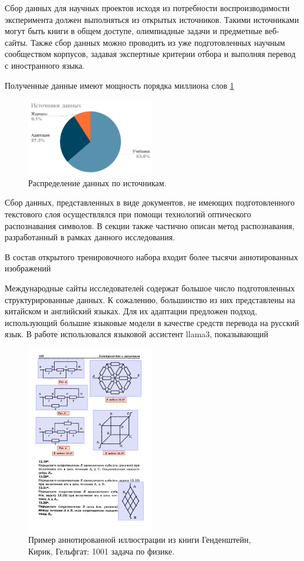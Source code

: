 Сбор данных для научных проектов исходя из потребности воспроизводимости эксперимента должен выполняться из открытых источников. 
Такими источниками могут быть книги в общем доступе, олимпиадные задачи и предметные веб-сайты. Также 
сбор данных можно проводить из уже подготовленных научным сообществом корпусов, задавая экспертные критерии
отбора и выполняя перевод с иностранного языка. 

Полученные данные имеют мощность порядка миллиона слов \ref{distribution} 

\begin{figure}[h]
    \centering
    \includegraphics[width=0.5\textwidth]{assets/work/dataset/diagram.png}
    \caption{Распределение данных по источникам.}
    \label{distribution}
\end{figure}

Сбор данных, представленных в виде  документов, не имеющих подготовленного текстового слоя осуществлялся при помощи технологий оптического распознавания символов.
В секции также частично описан метод распознавания, разработанный в рамках данного исследования.

В состав открытого тренировочного набора входит более тысячи аннотированных изображений 

Международные сайты исследователей содержат большое число подготовленных структурированные данных. 
К сожалению, большинство из них представлены на китайском и английский языках. Для их адаптации
предложен подход, использующий большие языковые модели в качестве средств перевода на русский язык.
В работе использовался языковой ассистент llama3, показывающий 
\begin{figure}[h]
    \centering
    \includegraphics[width=0.5\textwidth]{assets/work/dataset/kirik_labeling.png}
    \caption{Пример аннотированной иллюстрации из книги Генденштейн, Кирик, Гельфгат: 1001 задача по физике.}
    \label{annotation}
\end{figure}

